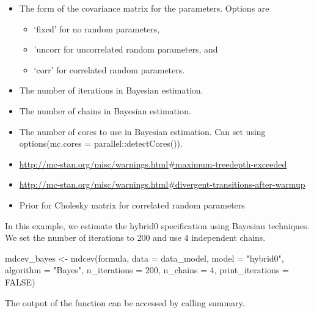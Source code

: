 \begin{itemize}
\item
   The form of the covariance matrix for the
  parameters. Options are

  \begin{itemize}
  \tightlist
  \item
    `fixed' for no random parameters,
  \item
    'uncorr for uncorrelated random parameters, and
  \item
    `corr' for correlated random parameters.
  \end{itemize}
\item
   The number of iterations in Bayesian estimation.
\item
   The number of chains in Bayesian estimation.
\item
   The number of cores to use in Bayesian estimation. Can
  set using options(mc.cores = parallel::detectCores()).
\item
  \url{http://mc-stan.org/misc/warnings.html\#maximum-treedepth-exceeded}
\item
  \url{http://mc-stan.org/misc/warnings.html\#divergent-transitions-after-warmup}
\item
   Prior for Cholesky matrix for correlated
  random parameters
\end{itemize}

In this example, we estimate the hybrid0 specification using Bayesian
techniques. We set the number of iterations to 200 and use 4 independent
chains.

\begin{Schunk}
\begin{Sinput}
mdcev_bayes <- mdcev(formula,
                        data = data_model,
                        model = "hybrid0",
                        algorithm = "Bayes",
                        n_iterations = 200,
                        n_chains = 4,
                        print_iterations = FALSE)
\end{Sinput}
\end{Schunk}

The output of the function can be accessed by calling summary.

